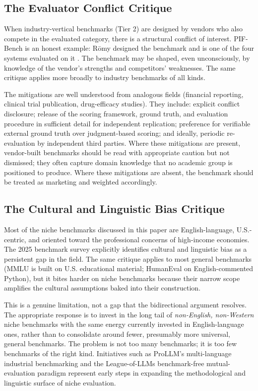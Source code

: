 \documentclass[11pt,a4paper]{article}
\begin{document}
\subsection{The Evaluator Conflict Critique}
\label{sec:conflict}

When industry-vertical benchmarks (Tier 2) are designed by vendors who also compete in the evaluated category, there is a structural conflict of interest. PIF-Bench is an honest example: R\={o}my designed the benchmark and is one of the four systems evaluated on it \citep{lijo2026pifbench}. The benchmark may be shaped, even unconsciously, by knowledge of the vendor's strengths and competitors' weaknesses. The same critique applies more broadly to industry benchmarks of all kinds.

The mitigations are well understood from analogous fields (financial reporting, clinical trial publication, drug-efficacy studies). They include: explicit conflict disclosure; release of the scoring framework, ground truth, and evaluation procedure in sufficient detail for independent replication; preference for verifiable external ground truth over judgment-based scoring; and ideally, periodic re-evaluation by independent third parties. Where these mitigations are present, vendor-built benchmarks should be read with appropriate caution but not dismissed; they often capture domain knowledge that no academic group is positioned to produce. Where these mitigations are absent, the benchmark should be treated as marketing and weighted accordingly.

\subsection{The Cultural and Linguistic Bias Critique}
\label{sec:bias}

Most of the niche benchmarks discussed in this paper are English-language, U.S.-centric, and oriented toward the professional concerns of high-income economies. The 2025 benchmark survey \citep{liu2025survey} explicitly identifies cultural and linguistic bias as a persistent gap in the field. The same critique applies to most general benchmarks (MMLU is built on U.S. educational material; HumanEval on English-commented Python), but it bites harder on niche benchmarks because their narrow scope amplifies the cultural assumptions baked into their construction.

This is a genuine limitation, not a gap that the bidirectional argument resolves. The appropriate response is to invest in the long tail of \emph{non-English, non-Western} niche benchmarks with the same energy currently invested in English-language ones, rather than to consolidate around fewer, presumably more universal, general benchmarks. The problem is not too many benchmarks; it is too few benchmarks of the right kind. Initiatives such as ProLLM's multi-language industrial benchmarking \citep{prollm2025} and the League-of-LLMs benchmark-free mutual-evaluation paradigm \citep{llmcrowdsourced2025} represent early steps in expanding the methodological and linguistic surface of niche evaluation.
\end{document}
